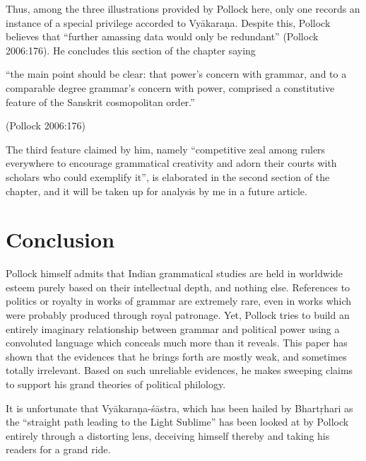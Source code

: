 Thus, among the three illustrations provided by Pollock here, only one records an instance of a special privilege accorded to Vyākaraṇa. Despite this, Pollock believes that ``further amassing data would only be redundant'' (Pollock 2006:176). He concludes this section of the chapter saying
\begin{myquote}
``the main point should be clear: that power’s concern with grammar, and to a comparable degree grammar's concern with power, comprised a constitutive feature of the Sanskrit cosmopolitan order.''

\hfill (Pollock 2006:176)
\end{myquote}
The third feature claimed by him, namely ``competitive zeal among rulers everywhere to encourage grammatical creativity and adorn their courts with scholars who could exemplify it'', is elaborated in the second section of the chapter, and it will be taken up for analysis by me in a future article.

\section*{Conclusion}

Pollock himself admits that Indian grammatical studies are held in worldwide esteem purely based on their intellectual depth, and nothing else. References to politics or royalty in works of grammar are extremely rare, even in works which were probably produced through royal patronage. Yet, Pollock tries to build an entirely imaginary relationship between grammar and political power using a convoluted language which conceals much more than it reveals. This paper has shown that the evidences that he brings forth are mostly weak, and sometimes totally irrelevant. Based on such unreliable evidences, he makes sweeping claims to support his grand theories of political philology. 

It is unfortunate that Vyākaraṇa-śāstra, which has been hailed by Bhartṛhari as the ``straight path leading to the Light Sublime'' has been looked at by Pollock entirely through a distorting lens, deceiving himself thereby and taking his readers for a grand ride. 

